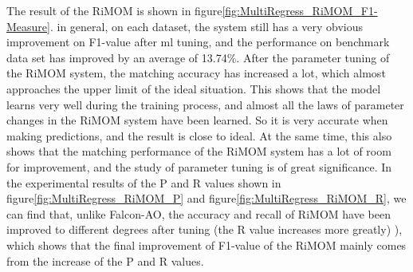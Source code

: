 \documentclass[twoside]{article}
\begin{document}
The result of the RiMOM is shown in figure\ref{fig:MultiRegress_RiMOM_F1-Measure}. in general, on each dataset, the system still has a very obvious improvement on F1-value after ml tuning, and the performance on benchmark data set has improved by an average of 13.74\%.
After the parameter tuning of the RiMOM system, the matching accuracy has increased a lot, which almost approaches the upper limit of the ideal situation.
This shows that the model learns very well during the training process, and almost all the laws of parameter changes in the RiMOM system have been learned. So it is very accurate when making predictions, and the result is close to ideal.
At the same time, this also shows that the matching performance of the RiMOM system has a lot of room for improvement, and the study of parameter tuning is of great significance.
In the experimental results of the P and R values shown in figure\ref{fig:MultiRegress_RiMOM_P} and figure\ref{fig:MultiRegress_RiMOM_R}, we can find that, unlike Falcon-AO, the accuracy and recall of RiMOM have been improved to different degrees after tuning (the R value increases more greatly) ), which shows that the final improvement of F1-value of the RiMOM mainly comes from the increase of the P and R values.

\end{document}
